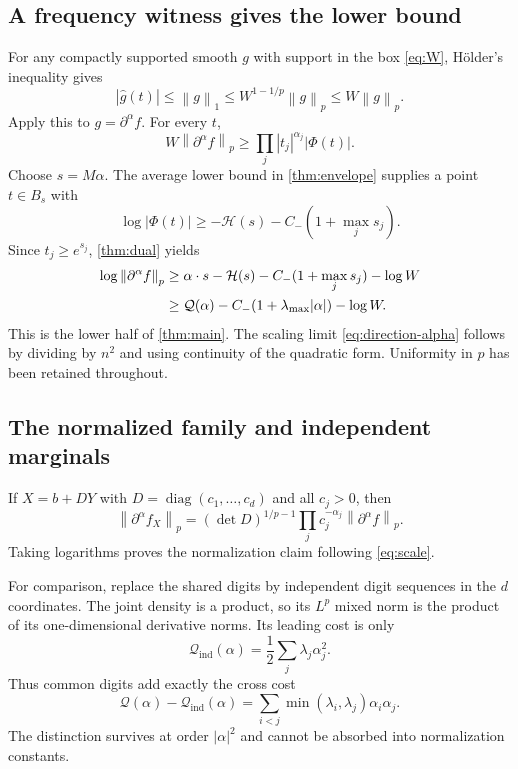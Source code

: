 \documentclass[11pt,a4paper]{article}
\numberwithin{equation}{section}
\theoremstyle{definition}
\theoremstyle{remark}\newtheorem{remark}[theorem]{Remark}
\newcommand{\He}{\mathcal H}
\newcommand{\Qf}{\mathcal Q}
\newcommand{\norm}[1]{\left\lVert #1\right\rVert}
\begin{document}
\subsection{A frequency witness gives the lower bound}

For any compactly supported smooth $g$ with support in the box
\eqref{eq:W}, H\"older's inequality gives
\begin{equation}
 |\widehat g(t)|\le\norm g_1\le W^{1-1/p}\norm g_p\le W\norm g_p.
 \label{eq:fourierlower}
\end{equation}
Apply this to $g=\partial^\alpha f$. For every $t$,
\begin{equation}
 W\norm{\partial^\alpha f}_p
      \ge\prod_j|t_j|^{\alpha_j}|\Phi(t)|.
 \label{eq:witness}
\end{equation}
Choose $s=M\alpha$. The average lower bound in
\cref{thm:envelope} supplies a point $t\in B_s$ with
\[
 \log|\Phi(t)|\ge-\He(s)-C_-(1+\max_js_j).
\]
Since $t_j\ge e^{s_j}$, \cref{thm:dual} yields
\begin{align}
 \log\norm{\partial^\alpha f}_p
 &\ge\alpha\cdot s-\He(s)-C_-(1+\max_js_j)-\log W\notag\\
 &\ge\Qf(\alpha)-C_-(1+\lambda_{\max}|\alpha|)-\log W.
 \label{eq:derivlower}
\end{align}
This is the lower half of \cref{thm:main}. The scaling limit
\eqref{eq:direction-alpha} follows by dividing by $n^2$ and using continuity
of the quadratic form. Uniformity in $p$ has been retained throughout.

\subsection{The normalized family and independent marginals}

If $X=b+DY$ with $D=\operatorname{diag}(c_1,\ldots,c_d)$ and all $c_j>0$, then
\begin{equation}
 \norm{\partial^\alpha f_X}_p
   =(\det D)^{1/p-1}\prod_jc_j^{-\alpha_j}
                     \norm{\partial^\alpha f}_p.
 \label{eq:normscale}
\end{equation}
Taking logarithms proves the normalization claim following \eqref{eq:scale}.

For comparison, replace the shared digits by independent digit sequences
in the $d$ coordinates. The joint density is a product, so its $L^p$ mixed
norm is the product of its one-dimensional derivative norms. Its leading
cost is only
\begin{equation}
 \Qf_{\mathrm{ind}}(\alpha)=\frac12\sum_j\lambda_j\alpha_j^2.
 \label{eq:independent}
\end{equation}
Thus common digits add exactly the cross cost
\begin{equation}
 \Qf(\alpha)-\Qf_{\mathrm{ind}}(\alpha)
      =\sum_{i<j}\min(\lambda_i,\lambda_j)\alpha_i\alpha_j.
 \label{eq:crosscost}
\end{equation}
The distinction survives at order $|\alpha|^2$ and cannot be absorbed into
normalization constants.
\end{document}
